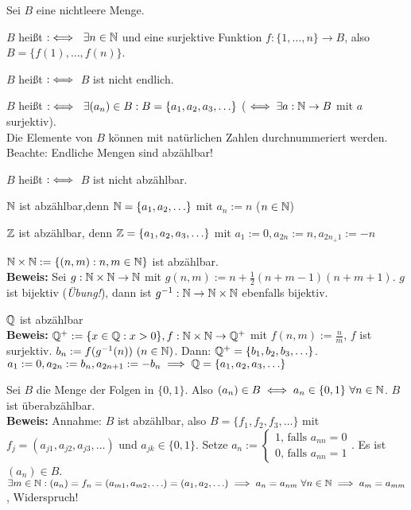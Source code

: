 \documentclass[a4paper,twoside,DIV15,BCOR12mm]{scrbook}
\begin{document}
\begin{definition}
Sei $B$ eine nichtleere Menge.
\begin{liste}
\item $B$ heißt  $:\iff \ \exists n \in \mathbb{N}$ und eine surjektive Funktion $f:\{1,\ldots,n\} \rightarrow B$, also $B=\{f(1),\ldots,f(n)\}$.
\item $B$ heißt  $:\iff$ $B$ ist nicht endlich.
\item $B$ heißt  $:\iff \ \exists  (a_n) \in B: B=\{a_1,a_2,a_3,\ldots\}$ ($\iff \exists a: \mathbb{N} \rightarrow B$  mit $a$ surjektiv).\\
\glqq Die Elemente von $B$ können mit natürlichen Zahlen durchnummeriert werden.\grqq\\
Beachte: Endliche Mengen sind abzählbar!
\item $B$ heißt  $:\iff$ $B$ ist nicht abzählbar.
\end{liste}
\end{definition}

\begin{beispiele}
\item $\mathbb{N}$ ist abzählbar,denn $\mathbb{N} = \{a_1,a_2,\ldots\}$ mit $a_n := n$ ($n\in \mathbb{N}$)
\item $\mathbb{Z}$ ist abzählbar, denn $\mathbb{Z} = \{a_1,a_2,a_3,\ldots\}$ mit $a_1:= 0, a_{2n} := n, a_{2n_+1} := -n$
\item $\mathbb{N}\times\mathbb{N} := \{(n,m): n,m \in \mathbb{N}\}$ ist abzählbar.\\
\textbf{Beweis:} Sei $g: \mathbb{N}\times\mathbb{N} \rightarrow \mathbb{N}$ mit $g(n,m) := n+\frac{1}{2}(n+m-1)(n+m+1)$. $g$ ist bijektiv (\textit{Übung!}), dann ist $g^{-1}: \mathbb{N} \rightarrow \mathbb{N}\times\mathbb{N}$ ebenfalls bijektiv.
\item $\mathbb{Q}$ ist abzählbar\\
\textbf{Beweis:} $\mathbb{Q}^+ := \{x \in \mathbb{Q}: x>0\}, f:\mathbb{N}\times\mathbb{N} \rightarrow \mathbb{Q}^+$ mit $f(n,m) := \frac{n}{m}$, $f$ ist surjektiv. $b_n := f(g^{-1}(n))\ (n\in\MdN)$. Dann: $\mathbb{Q}^+ = \{b_1, b_2, b_3,\ldots\}$. $a_1:= 0, a_{2n} := b_n, a_{2n+1} := -b_n \implies \mathbb{Q} = \{a_1,a_2,a_3,\ldots\}$
\item Sei $B$ die Menge der Folgen in $\{0,1\}$. Also $(a_n)\in B \equizu a_n \in \{0,1\} \ \forall n \in \MdN$. $B$ ist überabzählbar.\\
\textbf{Beweis:} Annahme: $B$ ist abzählbar, also $B=\{f_1,f_2,f_3,\ldots\}$ mit $f_j = (a_{j1}, a_{j2}, a_{j3},\ldots)$ und $a_{jk} \in \{0,1\}$. Setze $a_n := \begin{cases}1\mbox{, falls } a_{nn} = 0 \\ 0\mbox{, falls }a_{nn} = 1\end{cases}$. Es ist $(a_n) \in B$. \\
$\exists m \in \mathbb{N}: (a_n) = f_n = (a_{m1}, a_{m2}, \ldots) = (a_1,a_2,\ldots) \implies a_n = a_{nm}\ \forall n \in \mathbb{N} \implies a_m = a_{mm}$, Widerspruch!
\end{beispiele}
\end{document}

